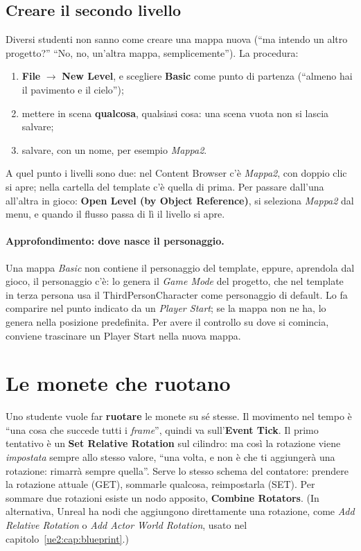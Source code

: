 \subsection{Creare il secondo livello}

Diversi studenti non sanno come creare una mappa nuova (``ma intendo un altro
progetto?'' ``No, no, un'altra mappa, semplicemente''). La procedura:
\begin{enumerate}
  \item \textbf{File} $\rightarrow$ \textbf{New Level}, e scegliere
        \textbf{Basic} come punto di partenza (``almeno hai il pavimento e
        il cielo'');
  \item mettere in scena \textbf{qualcosa}, qualsiasi cosa: una scena vuota
        non si lascia salvare;
  \item salvare, con un nome, per esempio \emph{Mappa2}.
\end{enumerate}
A quel punto i livelli sono due: nel Content Browser c'è \emph{Mappa2}, con
doppio clic si apre; nella cartella del template c'è quella di prima. Per
passare dall'una all'altra in gioco: \textbf{Open Level (by Object
Reference)}, si seleziona \emph{Mappa2} dal menu, e quando il flusso passa di
lì il livello si apre.

\paragraph{Approfondimento: dove nasce il personaggio.} Una mappa
\emph{Basic} non contiene il personaggio del template, eppure, aprendola dal
gioco, il personaggio c'è: lo genera il \emph{Game Mode} del progetto, che nel
template in terza persona usa il ThirdPersonCharacter come personaggio di
default. Lo fa comparire nel punto indicato da un \emph{Player Start}; se la
mappa non ne ha, lo genera nella posizione predefinita. Per avere il controllo
su dove si comincia, conviene trascinare un Player Start nella nuova mappa.

\section{Le monete che ruotano}
\label{gd7:sec:rotazione}

Uno studente vuole far \textbf{ruotare} le monete su sé stesse. Il movimento
nel tempo è ``una cosa che succede tutti i \emph{frame}'', quindi va
sull'\textbf{Event Tick}. Il primo tentativo è un \textbf{Set Relative
Rotation} sul cilindro: ma così la rotazione viene \emph{impostata} sempre
allo stesso valore, ``una volta, e non è che ti aggiungerà una rotazione:
rimarrà sempre quella''. Serve lo stesso schema del contatore: prendere la
rotazione attuale (GET), sommarle qualcosa, reimpostarla (SET). Per sommare
due rotazioni esiste un nodo apposito, \textbf{Combine Rotators}. (In
alternativa, Unreal ha nodi che aggiungono direttamente una rotazione, come
\emph{Add Relative Rotation} o \emph{Add Actor World Rotation}, usato nel
capitolo~\ref{ue2:cap:blueprint}.)

